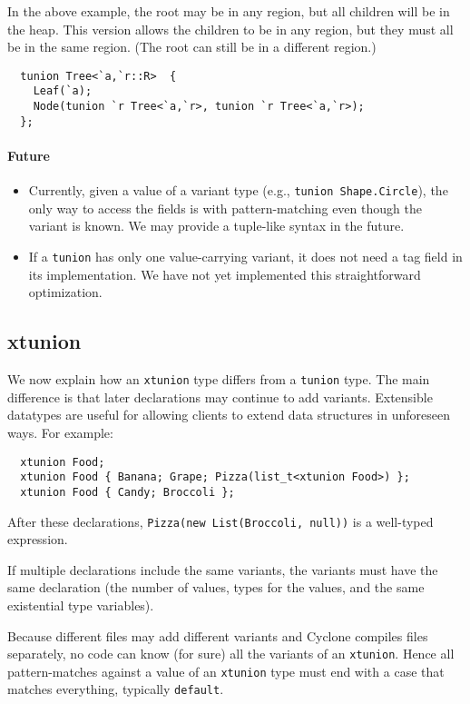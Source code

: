 In the above example, the root may be in any region, but all children
will be in the heap.  This version allows the children to be in any
region, but they must all be in the same region.  (The root can still
be in a different region.)

\begin{verbatim}
  tunion Tree<`a,`r::R>  {
    Leaf(`a);
    Node(tunion `r Tree<`a,`r>, tunion `r Tree<`a,`r>);
  };
\end{verbatim}

\paragraph{Future}
\begin{itemize}
\item Currently, given a value of a variant type (e.g.,
  \texttt{tunion Shape.Circle}), the only way to access the fields is
  with pattern-matching even though the variant is known.  We may
  provide a tuple-like syntax in the future.
\item If a \texttt{tunion} has only one value-carrying variant, it does
  not need a tag field in its implementation.  We have not yet
  implemented this straightforward optimization.
\end{itemize}

\subsection{xtunion}\hypertarget{xtunion_sec}{}

We now explain how an \texttt{xtunion} type differs from a \texttt{tunion}
type.  The main difference is that later declarations may continue to
add variants.  Extensible datatypes are useful for allowing clients to
extend data structures in unforeseen ways.  For example:
\begin{verbatim}
  xtunion Food;
  xtunion Food { Banana; Grape; Pizza(list_t<xtunion Food>) };
  xtunion Food { Candy; Broccoli };
\end{verbatim}

After these declarations, \texttt{Pizza(new List(Broccoli, null))} is a
well-typed expression.

If multiple declarations include the same variants, the variants must
have the same declaration (the number of values, types for the values,
and the same existential type variables).

Because different files may add different variants and Cyclone
compiles files separately, no code can know (for sure) all the
variants of an \texttt{xtunion}. Hence all pattern-matches against a
value of an \texttt{xtunion} type must end with a case that matches
everything, typically \texttt{default}.


